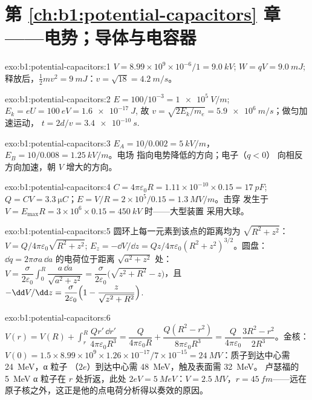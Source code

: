 \section*{第 \ref{ch:b1:potential-capacitors} 章——电势；导体与电容器}

\begin{solution}{exo:b1:potential-capacitors:1}
$V = 8.99 \times 10^9 \times 10^{-6}/1 = \qty{9.0}{kV}$; $W = qV = \qty{9.0}{mJ}$;
释放后，$\tfrac12mv^2 = \qty{9}{mJ}$：$v = \sqrt{18} = \qty{4.2}{m/s}$。
\end{solution}

\begin{solution}{exo:b1:potential-capacitors:2}
$E = 100/10^{-3} = \qty{1e5}{V/m}$; $E_k = eU = \qty{100}{eV} = \qty{1.6e-17}{J}$,
故 $v = \sqrt{2E_k/m_e} = \qty{5.9e6}{m/s}$；做匀加速运动，
$t = 2d/v = \qty{3.4e-10}{s}$.
\end{solution}

\begin{solution}{exo:b1:potential-capacitors:3}
$E_A = 10/0.002 = \qty{5}{kV/m}$，$E_B = 10/0.008 = \qty{1.25}{kV/m}$。电场
指向电势降低的方向；电子（$q < 0$）
向相反方向加速，朝 $V$ 增大的方向。
\end{solution}

\begin{solution}{exo:b1:potential-capacitors:4}
$C = 4\pi\varepsilon_0R = 1.11 \times 10^{-10} \times 0.15 = \qty{17}{pF}$; $Q = CV =
\qty{3.3}{\micro C}$；$E = V/R = 2 \times 10^5/0.15 = \qty{1.3}{MV/m}$。击穿
发生于 $V = E_{\max}R = 3 \times 10^6 \times 0.15 = \qty{450}{kV}$ 时——大型装置
采用大球。
\end{solution}

\begin{solution}{exo:b1:potential-capacitors:5}
圆环上每一元素到该点的距离均为 $\sqrt{R^2 + z^2}$：$V =
Q/4\pi\varepsilon_0\sqrt{R^2 + z^2}$; $E_z = -\dd V/\dd z = Qz/4\pi\varepsilon_0(R^2 +
z^2)^{3/2}$。圆盘：$\dd q = 2\pi\sigma a\,\dd a$ 的电荷位于距离 $\sqrt{a^2 + z^2}$ 处：$V =
\dfrac{\sigma}{2\varepsilon_0}\displaystyle\int_0^R\dfrac{a\,\dd a}{\sqrt{a^2 + z^2}} =
\dfrac{\sigma}{2\varepsilon_0}\bigl(\sqrt{z^2 + R^2} - z\bigr)$，且 $-\dd V/\dd z =
\dfrac{\sigma}{2\varepsilon_0}\Bigl(1 - \dfrac{z}{\sqrt{z^2 + R^2}}\Bigr)$.
\end{solution}

\begin{solution}{exo:b1:potential-capacitors:6}
$V(r) = V(R) + \displaystyle\int_r^R\dfrac{Qr'\,\dd r'}{4\pi\varepsilon_0R^3} =
\dfrac{Q}{4\pi\varepsilon_0R} + \dfrac{Q(R^2 - r^2)}{8\pi\varepsilon_0R^3} = \dfrac{Q}{4\pi\varepsilon_0}
\dfrac{3R^2 - r^2}{2R^3}$。金核：$V(0) = 1.5 \times 8.99 \times 10^9 \times 1.26 \times
10^{-17}/7 \times 10^{-15} = \qty{24}{MV}$：质子到达中心需 \qty{24}{MeV}，α 粒子
（$2e$）到达中心需 \qty{48}{MeV}，触及表面需 \qty{32}{MeV}。
卢瑟福的 \qty{5}{MeV} α 粒子在 $r$ 处折返，此处 $2eV =
\qty{5}{MeV}$：$V = \qty{2.5}{MV}$，$r = \qty{45}{fm}$——远在
原子核之外，这正是他的点电荷分析得以奏效的原因。
\end{solution}

